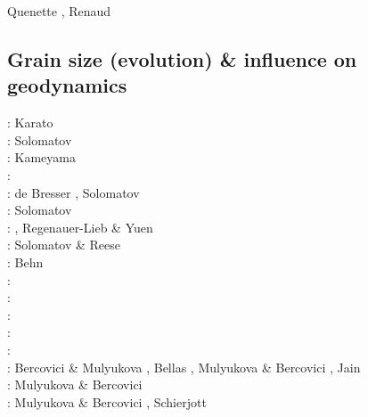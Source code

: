 \begin{scriptsize}
Quenette \etal \cite{quxm15}, Renaud \etal \cite{revf19}
\end{scriptsize}

\subsection{Grain size (evolution) \& influence on geodynamics}
\label{sec:topics:gsev}

\begin{scriptsize}
\nineteeneightyfour: Karato \cite{kara84}\\
\nineteenninetysix: Solomatov \cite{solo96}\\
\nineteenninetyseven: Kameyama \etal \cite{kayf97}\\
\nineteeneightynine: \cite{brcp99}\\
\twothousandone: de Bresser \etal \cite{dets01}, Solomatov \cite{solo01}\\
\twothousandtwo: Solomatov \etal \cite{soet02}\\
\twothousandthree: \cite{hapa03}, Regenauer-Lieb \& Yuen \cite{reyu03}\\
\twothousandeight: Solomatov \& Reese \cite{sore08}\\
\twothousandnine: Behn \etal \cite{behe09}\\
\twothousandeleven: \cite{rorb11}\\
\twothousandthirteen: \cite{beri13}\\
\twothousandfourteen: \cite{besr14}\\
\twothousandfifteen: \cite{thrk15}\cite{tukb15}\cite{pevp15}\cite{glfa15}\\
\twothousandseventeen: \cite{ceww17}\cite{daef17}\cite{mube17}\cite{scdu17}\\
\twothousandeighteen: Bercovici \& Mulyukova \cite{bemu18}, Bellas \etal \cite{bezb18},
                      Mulyukova \& Bercovici \cite{mube18}, Jain \etal \cite{jakk18}\\
\twothousandnineteen: Mulyukova \& Bercovici \cite{mube19}\\
\twothousandtwenty: Mulyukova \& Bercovici \cite{mube20}, Schierjott \etal \cite{scrt20,sctr20}
\end{scriptsize}

